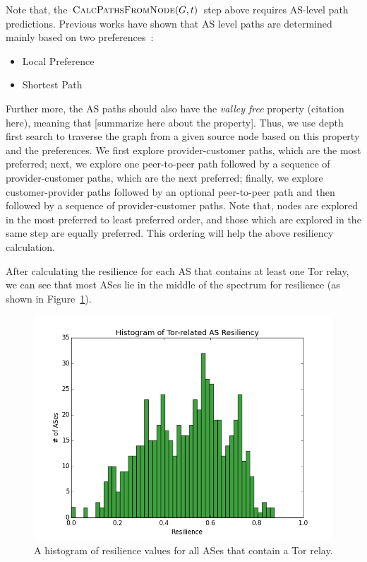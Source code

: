 Note that, the $\Call{CalcPathsFromNode}{G,t}$ step above requires AS-level path predictions. Previous works have shown that AS level paths are determined mainly based on two preferences~\cite{starov2015measuring}:

\begin{itemize}
\item Local Preference
\item Shortest Path
\end{itemize}

Further more, the AS paths should also have the \emph{valley free} property (citation here), meaning that  [summarize here about the property]. Thus, we use depth first search to traverse the graph from a given source node based on this property and the preferences. We first explore provider-customer paths, which are the most preferred; next, we explore one peer-to-peer path followed by a sequence of provider-customer paths, which are the next preferred; finally, we explore customer-provider paths followed by an optional peer-to-peer path and then followed by a sequence of provider-customer paths. Note that, nodes are explored in the most preferred to least preferred order, and those which are explored in the same step are equally preferred. This ordering will help the above resiliency calculation. 
\\
\begin{algorithmic}
	\State [to be filled]
\EndFunction
\end{algorithmic}

After calculating the resilience for each AS that contains at least one Tor relay, we can see that most ASes lie in the middle of the spectrum for resilience (as shown in Figure~\ref{fig:resilience_histogram}).

\begin{figure}
\centering
\includegraphics[width=.5\textwidth]{resilience_histogram}
\caption{A histogram of resilience values for all ASes that contain a Tor relay.}
\label{fig:resilience_histogram}
\end{figure}

